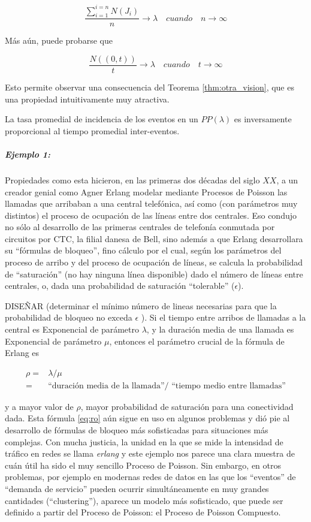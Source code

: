 \documentclass[
  oneside]{article}
\begin{document}
\begin{equation}
\frac{\sum_{i=1}^{i=n} N(J_i)}{n} \rightarrow \lambda \quad cuando \quad n\rightarrow \infty
\end{equation}

Más aún, puede probarse que

\begin{equation}
\frac{N((0,t))}{t} \rightarrow \lambda \quad cuando \quad t \rightarrow \infty
\end{equation}

Esto permite observar una consecuencia del Teorema
\ref{thm:otra_vision}, que es una propiedad intuitivamente muy
atractiva.

La tasa promedial de incidencia de los eventos en un \(PP(\lambda)\) es
inversamente proporcional al tiempo promedial inter-eventos.

\hypertarget{ejemplo-1}{%
\subparagraph{Ejemplo 1:}\label{ejemplo-1}}

Propiedades como esta hicieron, en las primeras dos décadas del siglo
\(XX\), a un creador genial como Agner Erlang modelar mediante Procesos
de Poisson las llamadas que arribaban a una central telefónica, así como
(con parámetros muy distintos) el proceso de ocupación de las líneas
entre dos centrales. Eso condujo no sólo al desarrollo de las primeras
centrales de telefonía conmutada por circuitos por CTC, la filial danesa
de Bell, sino además a que Erlang desarrollara su ``fórmulas de
bloqueo'', fino cálculo por el cual, según los parámetros del proceso de
arribo y del proceso de ocupación de líneas, se calcula la probabilidad
de ``saturación'' (no hay ninguna línea disponible) dado el número de
líneas entre centrales, o, dada una probabilidad de saturación
``tolerable'' (\(\epsilon\)).

DISEÑAR (determinar el mínimo número de lineas necesarias para que la
probabilidad de bloqueo no exceda \(\epsilon\) ). Si el tiempo entre
arribos de llamadas a la central es Exponencial de parámetro
\(\lambda\), y la duración media de una llamada es Exponencial de
parámetro \(\mu\), entonces el parámetro crucial de la fórmula de Erlang
es

\begin{align}
\rho=&\lambda/\mu  \nonumber \\
= &\text{“duración media de la llamada”/ “tiempo medio entre llamadas”}\label{eq:ro}
\end{align}

y a mayor valor de \(\rho\), mayor probabilidad de saturación para una
conectividad dada. Esta fórmula \eqref{eq:ro} aún sigue en uso en
algunos problemas y dió pie al desarrollo de fórmulas de bloqueo más
sofisticadas para situaciones más complejas. Con mucha justicia, la
unidad en la que se mide la intensidad de tráfico en redes se llama
\textit{erlang} y este ejemplo nos parece una clara muestra de cuán útil
ha sido el muy sencillo Proceso de Poisson. Sin embargo, en otros
problemas, por ejemplo en modernas redes de datos en las que los
``eventos'' de ``demanda de servicio'' pueden ocurrir simultáneamente en
muy grandes cantidades (``clustering''), aparece un modelo más
sofisticado, que puede ser definido a partir del Proceso de Poisson: el
Proceso de Poisson Compuesto.
\end{document}
